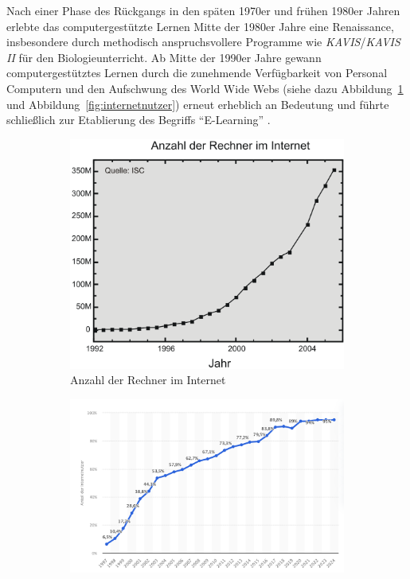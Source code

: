 Nach einer Phase des Rückgangs in den späten 1970er und frühen 1980er Jahren erlebte das computergestützte Lernen Mitte der 1980er Jahre eine Renaissance, insbesondere durch methodisch anspruchsvollere Programme wie \textit{KAVIS}/\textit{KAVIS II} für den Biologieunterricht. Ab Mitte der 1990er Jahre gewann computergestütztes Lernen durch die zunehmende Verfügbarkeit von Personal Computern und den Aufschwung des World Wide Webs (siehe dazu Abbildung~\ref{fig:rechner_internet} und Abbildung~\ref{fig:internetnutzer}) erneut erheblich an Bedeutung und führte schließlich zur Etablierung des Begriffs \enquote{E-Learning} \parencite[S.~11]{niegemann_kompendium_2008}.

\begin{figure}[h!]
    \centering
    \begin{subfigure}[b]{0.48\textwidth}
        \centering
        \includegraphics[width=\textwidth]{img/Anzahl_Rechner_im_Internet-2004.png}
        \caption{Anzahl der Rechner im Internet \cite{internet_systems_consortium_internet_2005}}
        \label{fig:rechner_internet}
		    \end{subfigure}
    \hfill
    \begin{subfigure}[b]{0.48\textwidth}
        \centering
        \includegraphics[width=\textwidth]{img/Anzahl_Internetnutzer-2024.png}

\end{subfigure}
\end{figure}

